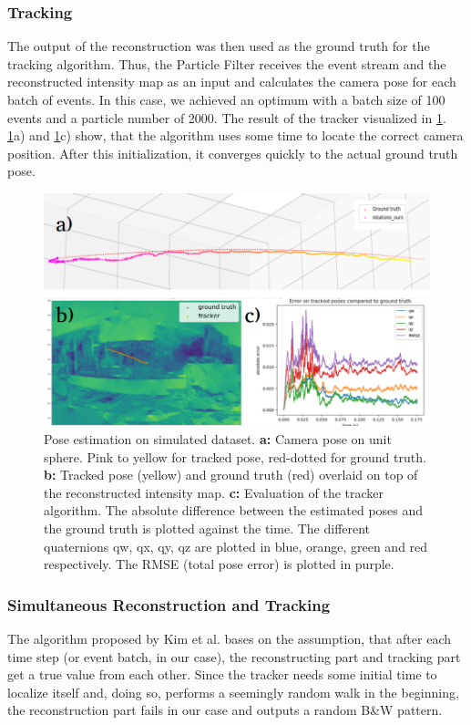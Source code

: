 \documentclass[10pt,twocolumn,letterpaper]{article}
\begin{document}
\subsubsection{Tracking}
The output of the reconstruction was then used as the ground truth for the tracking algorithm. Thus, the Particle Filter receives the event stream and the reconstructed intensity map as an input and calculates the camera pose for each batch of events. In this case, we achieved an optimum with a batch size of 100 events and a particle number of 2000. The result of the tracker visualized in \cref{fig:tracker_simulated}. \cref{fig:tracker_simulated}a) and \cref{fig:tracker_simulated}c) show, that the algorithm uses some time to locate the correct camera position. After this initialization, it converges quickly to the actual ground truth pose. 
\begin{figure}[h!]
	\centering
    \includegraphics[width=1.0\linewidth]{figures/tracker_output.png}   
    \caption{Pose estimation on simulated dataset. \textbf{a:} Camera pose on unit sphere. Pink to yellow for tracked pose, red-dotted for ground truth. \textbf{b:} Tracked pose (yellow) and ground truth (red) overlaid on top of the reconstructed intensity map. \textbf{c:} Evaluation of the tracker algorithm. The absolute difference between the estimated poses and the ground truth is plotted against the time. The different quaternions qw, qx, qy, qz are plotted in blue, orange, green and red respectively. The RMSE (total pose error) is plotted in purple. }
    \label{fig:tracker_simulated}
\end{figure}

\subsubsection{Simultaneous Reconstruction and Tracking}
The algorithm proposed by Kim et al. \cite{kim2014simultaneous} bases on the assumption, that after each time step (or event batch, in our case), the reconstructing part and tracking part get a true value from each other. Since the tracker needs some initial time to localize itself and, doing so, performs a seemingly random walk in the beginning, the reconstruction part fails in our case and outputs a random B&W pattern. 
\end{document}
